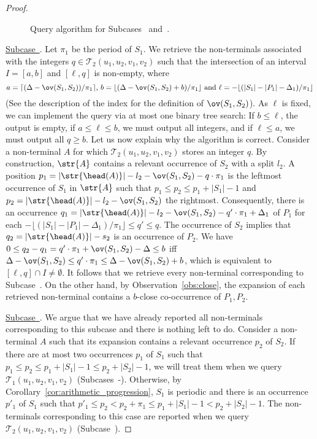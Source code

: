 \begin{proof}
\begin{figure}[!ht]
\caption{Query algorithm for Subcases~ and~.}
\label{fig:included}
\end{figure}

{\underline{Subcase~}}. Let $\pi_1$ be the period of $S_1$. We retrieve the non-terminals associated with the integers $q \in \mathcal{T}_2(u_1, u_2,v_1, v_2)$ such that the intersection of an interval $I = [a,b]$ and $[\ell,q]$ is non-empty, where 
{\small $$a=\lceil{(\Delta-\ov(S_1,S_2))/\pi_1\rceil} \text{, } b=\lfloor{(\Delta-\ov(S_1,S_2)+b)/ \pi_1 \rfloor} \text{ and } \ell = -\lfloor{(|S_1|-|P_1|-\Delta_1)/\pi_1\rfloor}$$}
(See the description of the index for the definition of $\ov(S_1,S_2)$). As $\ell$ is fixed, we can implement the query via at most one binary tree search: If $b \le \ell$, the output is empty, if $a \le \ell \le b$, we must output all integers, and if $\ell \le a$, we must output all $q \ge b$. Let us now explain why the algorithm is correct. Consider a non-terminal $A$ for which $\mathcal{T}_2(u_1, u_2,v_1, v_2)$ stores an integer $q$. By construction, $\str{A}$ contains a relevant occurrence of $S_2$ with a split $l_2$. A position $p_1 = |\str{\head(A)}|-l_2-\ov(S_1,S_2)-q \cdot \pi_1$ is the leftmost occurrence of $S_1$ in $\str{A}$ such that $p_1 \le p_2 \le p_1+|S_1|-1$ and $p_2 = |\str{\head(A)}|-l_2-\ov(S_1,S_2)$ the rightmost. Consequently, there is an occurrence $q_1 = |\str{\head(A)}|-l_2-\ov(S_1,S_2)-q'\cdot \pi_1+\Delta_1$ of $P_1$ for each $-\lfloor{(|S_1|-|P_1|-\Delta_1)/\pi_1\rfloor} \le q' \le q$. The occurrence of $S_2$ implies that $q_2 = |\str{\head(A)}|-s_2$ is an occurrence of $P_2$. We have $0 \le q_2-q_1=q'\cdot\pi_1+\ov(S_1,S_2)-\Delta\le b$ iff $\Delta-\ov(S_1,S_2) \le  q' \cdot \pi_1 \le \Delta-\ov(S_1,S_2)+b$, which is equivalent to $[\ell,q] \cap I \neq \emptyset$. It follows that we retrieve every non-terminal corresponding to Subcase~. On the other hand, by Observation~\ref{obs:close}, the expansion of each retrieved non-terminal contains a $b$-close co-occurrence of $P_1, P_2$.

{\underline{Subcase~}}. We argue that we have already reported all non-terminals corresponding to this subcase and there is nothing left to do. Consider a non-terminal $A$ such that its expansion contains a relevant occurrence $p_2$ of $S_2$. If there are at most two occurrences $p_1$ of $S_1$ such that $p_1 \le p_2 \le p_1+|S_1|-1\le p_2+|S_2|-1$, we will treat them when we query $\mathcal{T}_1(u_1, u_2,v_1, v_2)$ (Subcases~-). Otherwise, by Corollary~\ref{cor:arithmetic_progression}, $S_1$ is periodic and there is an occurrence $p'_1$ of $S_1$ such that $p'_1 \le p_2 < p_2 + \pi_1 \le p_1+|S_1|-1 < p_2 + |S_2|-1$. The non-terminals corresponding to this case are reported when we query $\mathcal{T}_2(u_1, u_2,v_1, v_2)$ (Subcase~).



\end{proof}
